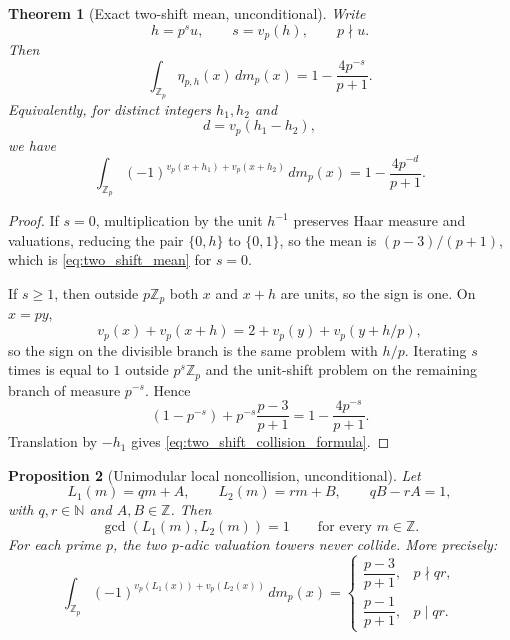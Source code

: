 \documentclass[11pt]{amsart}
\numberwithin{equation}{section}
\theoremstyle{plain}
\newtheorem{theorem}{Theorem}[section]
\newtheorem{proposition}[theorem]{Proposition}
\theoremstyle{definition}
\theoremstyle{remark}
\newcommand{\N}{\mathbb N}
\newcommand{\Z}{\mathbb Z}
\begin{document}
\begin{theorem}[Exact two-shift mean, unconditional]
\label{thm:two_shift_mean}
Write
\begin{equation}
h=p^s u,
\qquad s=v_p(h),
\qquad p\nmid u.
\label{eq:h_factorization}
\end{equation}
Then
\begin{equation}
\int_{\Z_p}\eta_{p,h}(x)\,dm_p(x)
=1-\frac{4p^{-s}}{p+1}.
\label{eq:two_shift_mean}
\end{equation}
Equivalently, for distinct integers $h_1,h_2$ and
\begin{equation}
d=v_p(h_1-h_2),
\label{eq:collision_depth}
\end{equation}
we have
\begin{equation}
\int_{\Z_p}(-1)^{v_p(x+h_1)+v_p(x+h_2)}\,dm_p(x)
=1-\frac{4p^{-d}}{p+1}.
\label{eq:two_shift_collision_formula}
\end{equation}
\end{theorem}

\begin{proof}
If $s=0$, multiplication by the unit $h^{-1}$ preserves Haar measure and valuations, reducing the pair $\{0,h\}$ to $\{0,1\}$, so the mean is $(p-3)/(p+1)$, which is \eqref{eq:two_shift_mean} for $s=0$.

If $s\ge1$, then outside $p\Z_p$ both $x$ and $x+h$ are units, so the sign is one.  On $x=py$,
\begin{equation}
v_p(x)+v_p(x+h)=2+v_p(y)+v_p(y+h/p),
\label{eq:shift_recursion_valuation}
\end{equation}
so the sign on the divisible branch is the same problem with $h/p$.  Iterating $s$ times is equal to $1$ outside $p^s\Z_p$ and the unit-shift problem on the remaining branch of measure $p^{-s}$.  Hence
\begin{equation}
(1-p^{-s})+p^{-s}\frac{p-3}{p+1}
=1-\frac{4p^{-s}}{p+1}.
\label{eq:two_shift_mean_proof}
\end{equation}
Translation by $-h_1$ gives \eqref{eq:two_shift_collision_formula}.
\end{proof}

\begin{proposition}[Unimodular local noncollision, unconditional]
\label{prop:unimodular_local}
Let
\begin{equation}
L_1(m)=qm+A,
\qquad
L_2(m)=rm+B,
\qquad
qB-rA=1,
\label{eq:unimodular_forms}
\end{equation}
with $q,r\in\N$ and $A,B\in\Z$.  Then
\begin{equation}
\gcd(L_1(m),L_2(m))=1
\qquad\text{for every }m\in\Z.
\label{eq:unimodular_value_coprimality}
\end{equation}
For each prime $p$, the two $p$-adic valuation towers never collide.  More precisely:
\begin{equation}
\int_{\Z_p}(-1)^{v_p(L_1(x))+v_p(L_2(x))}\,dm_p(x)
=
\begin{cases}
\dfrac{p-3}{p+1},&p\nmid qr,\\[2mm]
\dfrac{p-1}{p+1},&p\mid qr.
\end{cases}
\label{eq:unimodular_local_mean}
\end{equation}
\end{proposition}
\end{document}
